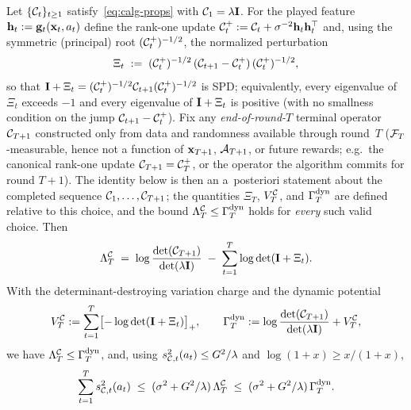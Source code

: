 \begin{lemma}\label{lem:dynamic-potential}
Let $\{\mathcal{C}_t\}_{t\ge1}$ satisfy~\eqref{eq:calg-props} with
$\mathcal{C}_1=\lambda\mathbf{I}$.  For the played feature
$\mathbf{h}_t:=\mathbf{g}_t(\mathbf{x}_t,a_t)$ define the rank-one update
$\mathcal{C}_t^{+}:=\mathcal{C}_t+\sigma^{-2}\mathbf{h}_t\mathbf{h}_t^\top$ and, using the symmetric
(principal) root $(\mathcal{C}_t^{+})^{-1/2}$, the normalized perturbation
\begin{equation}\label{eq:xi-def}
  \Xi_t \;:=\; (\mathcal{C}_t^{+})^{-1/2}\,(\mathcal{C}_{t+1}-\mathcal{C}_t^{+})\,
  (\mathcal{C}_t^{+})^{-1/2},
\end{equation}
so that $\mathbf{I}+\Xi_t=(\mathcal{C}_t^{+})^{-1/2}\mathcal{C}_{t+1}(\mathcal{C}_t^{+})^{-1/2}$ is SPD;
equivalently, every eigenvalue of $\Xi_t$ exceeds $-1$ and every eigenvalue of
$\mathbf{I}+\Xi_t$ is positive (with no smallness condition on the jump
$\mathcal{C}_{t+1}-\mathcal{C}_t^{+}$).  Fix any \emph{end-of-round-$T$} terminal operator
$\mathcal{C}_{T+1}$ constructed only from data and randomness available through
round~$T$ ($\mathcal{F}_T$-measurable, hence not a function of $\mathbf{x}_{T+1}$, $\mathcal{A}_{T+1}$,
or future rewards; e.g.\ the canonical rank-one update $\mathcal{C}_{T+1}=\mathcal{C}_T^{+}$,
or the operator the algorithm commits for round $T{+}1$).  The identity below is
then an a~posteriori statement about the completed sequence
$\mathcal{C}_1,\dots,\mathcal{C}_{T+1}$; the quantities $\Xi_T$, $V^{\mathcal{C}}_T$, and $\Gamma^{\mathrm{dyn}}_T$
are defined relative to this choice, and the bound $\Lambda^{\mathcal{C}}_T\le\Gamma^{\mathrm{dyn}}_T$ holds
for \emph{every} such valid choice.  Then
\begin{equation}\label{eq:lam-identity}
  \Lambda^{\mathcal{C}}_T
  \;=\;
  \log\frac{\det(\mathcal{C}_{T+1})}{\det(\lambda\mathbf{I})}
  \;-\;
  \sum_{t=1}^T \log\det(\mathbf{I}+\Xi_t).
\end{equation}
With the determinant-destroying variation charge and the dynamic potential
\begin{equation}\label{eq:vdyn-def}
  V^{\mathcal{C}}_T := \sum_{t=1}^T \bigl[-\log\det(\mathbf{I}+\Xi_t)\bigr]_+,
  \qquad
  \Gamma^{\mathrm{dyn}}_T := \log\frac{\det(\mathcal{C}_{T+1})}{\det(\lambda\mathbf{I})} + V^{\mathcal{C}}_T,
\end{equation}
we have $\Lambda^{\mathcal{C}}_T\le\Gamma^{\mathrm{dyn}}_T$, and, using
$s_{\mathcal{C},t}^2(a_t)\le G^2/\lambda$ and $\log(1+x)\ge x/(1+x)$,
\begin{equation}\label{eq:width-sum-dyn}
  \sum_{t=1}^T s_{\mathcal{C},t}^2(a_t)
  \;\le\;
  (\sigma^2+G^2/\lambda)\,\Lambda^{\mathcal{C}}_T
  \;\le\;
  (\sigma^2+G^2/\lambda)\,\Gamma^{\mathrm{dyn}}_T .
\end{equation}
\end{lemma}
